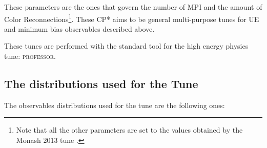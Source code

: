 \noindent These parameters are the ones that govern the number of MPI and the amount of Color Reconnections\footnote{Note that all the other parameters are set to the values obtained by the Monash 2013  tune \cite{Monash}.}. These CP* aims to be general multi-purpose tunes for UE and minimum bias observables described above.

These tunes are performed with the standard tool for the  high energy physics tune: \textsc{professor}. 



\subsection{The distributions used for the Tune}
\label{sec:Thedistributionsused}

The observables distributions used for the tune are the following ones:


